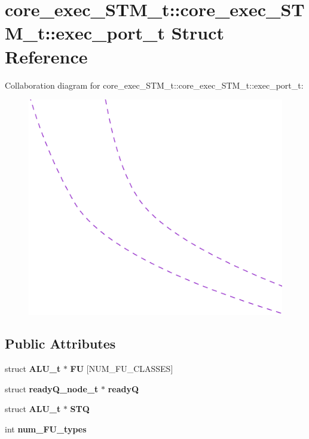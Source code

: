 \section{core\_\-exec\_\-STM\_\-t::core\_\-exec\_\-STM\_\-t::exec\_\-port\_\-t Struct Reference}
\label{structcore__exec__STM__t_1_1exec__port__t}
Collaboration diagram for core\_\-exec\_\-STM\_\-t::core\_\-exec\_\-STM\_\-t::exec\_\-port\_\-t:\nopagebreak
\begin{figure}[H]
\begin{center}
\leavevmode
\includegraphics[width=400pt]{structcore__exec__STM__t_1_1exec__port__t__coll__graph}
\end{center}
\end{figure}
\subsection*{Public Attributes}
\begin{CompactItemize}
\item 
struct {\bf ALU\_\-t} $\ast$ {\bf FU} [NUM\_\-FU\_\-CLASSES]
\item 
struct {\bf readyQ\_\-node\_\-t} $\ast$ {\bf readyQ}
\item 
struct {\bf ALU\_\-t} $\ast$ {\bf STQ}
\item 
int {\bf num\_\-FU\_\-types}
\end{CompactItemize}


